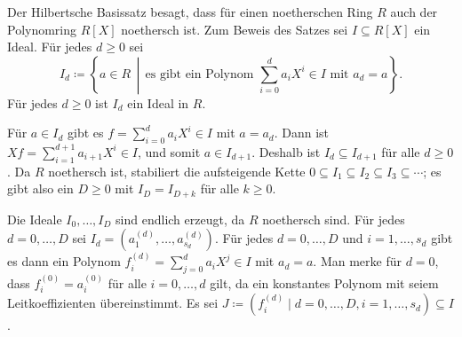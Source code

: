 \begin{solution}
  Der Hilbertsche Basissatz besagt, dass für einen noetherschen Ring $R$ auch der Polynomring $R[X]$ noethersch ist.
  Zum Beweis des Satzes sei $I \subseteq R[X]$ ein Ideal.
  Für jedes $d \geq 0$ sei
  \[
              I_d
    \coloneqq \left\{
                a \in R
              \,\middle|\,
                \text{es gibt ein Polynom $\sum_{i=0}^d a_i X^i \in I$ mit $a_d = a$}
              \right\}.
  \]
  Für jedes $d \geq 0$ ist $I_d$ ein Ideal in $R$.
  
  Für $a \in I_d$ gibt es $f = \sum_{i=0}^d a_i X^i \in I$ mit $a = a_d$.
  Dann ist $X f = \sum_{i=1}^{d+1} a_{i+1} X^i \in I$, und somit $a \in I_{d+1}$.
  Deshalb ist $I_d \subseteq I_{d+1}$ für alle $d \geq 0$.
  Da $R$ noethersch ist, stabiliert die aufsteigende Kette $0 \subseteq I_1 \subseteq I_2 \subseteq I_3 \subseteq \dotsb$; es gibt also ein $D \geq 0$ mit $I_D = I_{D+k}$ für alle $k \geq 0$.
  
  Die Ideale $I_0, \dotsc, I_D$ sind endlich erzeugt, da $R$ noethersch sind.
  Für jedes $d = 0, \dotsc, D$ sei $I_d = (a^{(d)}_1, \dotsc, a^{(d)}_{s_d})$.
  Für jedes $d = 0, \dotsc, D$ und $i = 1, \dotsc, s_d$ gibt es dann ein Polynom $f^{(d)}_i = \sum_{j=0}^d a_i X^j \in I$ mit $a_d = a$.
  Man merke für $d = 0$, dass $f^{(0)}_i = a^{(0)}_i$ für alle $i = 0, \dotsc, d$ gilt, da ein konstantes Polynom mit seiem Leitkoeffizienten übereinstimmt.
  Es sei $J \coloneqq ( f^{(d)}_i \mid d = 0, \dotsc, D, i = 1, \dotsc, s_d ) \subseteq I$.
  

\end{solution}
